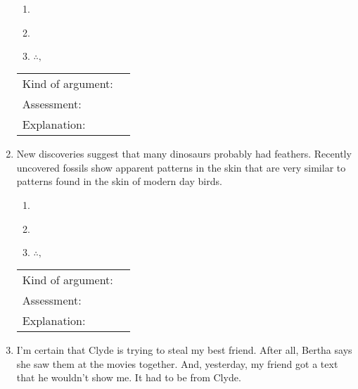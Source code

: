 \documentclass[10pt]{article}
\begin{document}
\begin{enumerate}
  \begin{enumerate}[1.]
    \item \underline{\hspace{6in}}
    \item \underline{\hspace{6in}}
    \item \underline{$\therefore,$\hspace{5.9in}}
  \end{enumerate}
  
  \begin{tabular}{ll}
    Kind of argument: & \underline{\hspace{1.5in}} \\
    Assessment: & \underline{\hspace{1.5in}} \\
    Explanation: & \\
  \end{tabular}

\vspace{.9in}

  \item New discoveries suggest that many dinosaurs probably had feathers.  Recently uncovered fossils show apparent patterns in the skin that are very similar to patterns found in the skin of modern day birds.
  
    \begin{enumerate}[1.]
    \item \underline{\hspace{6in}}
    \item \underline{\hspace{6in}}
    \item \underline{$\therefore,$\hspace{5.9in}}
  \end{enumerate}
  
  \begin{tabular}{ll}
    Kind of argument: & \underline{\hspace{1.5in}} \\
    Assessment: & \underline{\hspace{1.5in}} \\
    Explanation: & \\
  \end{tabular}

\vspace{.9in}
  
  \item I'm certain that Clyde is trying to steal my best friend.  After all, Bertha says she saw them at the movies together.  And, yesterday, my friend got a text that he wouldn't show me.  It had to be from Clyde.


\end{enumerate}
\end{document}
